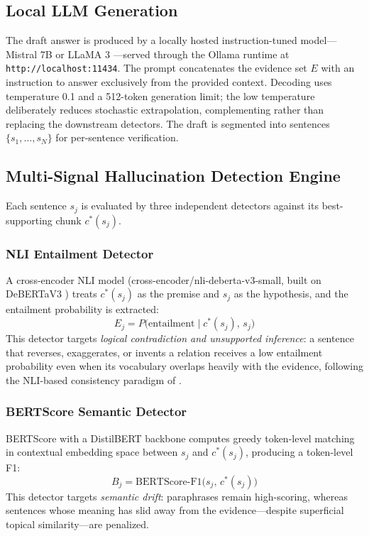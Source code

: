 \documentclass[journal]{IEEEtran}
\begin{document}
\subsection{Local LLM Generation}
The draft answer is produced by a locally hosted instruction-tuned
model---Mistral 7B \cite{jiang2023mistral} or LLaMA 3
\cite{touvron2023llama}---served through the Ollama runtime at
\texttt{http://localhost:11434}. The prompt concatenates the evidence set
$E$ with an instruction to answer exclusively from the provided context.
Decoding uses temperature 0.1 and a 512-token generation limit; the low
temperature deliberately reduces stochastic extrapolation, complementing
rather than replacing the downstream detectors. The draft is segmented into
sentences $\{s_1, \ldots, s_N\}$ for per-sentence verification.

\subsection{Multi-Signal Hallucination Detection Engine}
Each sentence $s_j$ is evaluated by three independent detectors against its
best-supporting chunk $c^{*}(s_j)$.

\subsubsection{NLI Entailment Detector}
A cross-encoder NLI model (cross-encoder/nli-deberta-v3-small, built on
DeBERTaV3 \cite{he2023debertav3}) treats $c^{*}(s_j)$ as the premise and
$s_j$ as the hypothesis, and the entailment probability is extracted:
\begin{equation}
E_j = P\big(\mathrm{entailment} \mid c^{*}(s_j),\, s_j\big)
\label{eq:nli}
\end{equation}
This detector targets \emph{logical contradiction and unsupported
inference}: a sentence that reverses, exaggerates, or invents a relation
receives a low entailment probability even when its vocabulary overlaps
heavily with the evidence, following the NLI-based consistency paradigm of
\cite{kryscinski2020factcc,laban2022summac}.

\subsubsection{BERTScore Semantic Detector}
BERTScore \cite{zhang2020bertscore} with a DistilBERT backbone
\cite{sanh2019distilbert} computes greedy token-level matching in contextual
embedding space between $s_j$ and $c^{*}(s_j)$, producing a token-level F1:
\begin{equation}
B_j = \mathrm{BERTScore\mbox{-}F1}\big(s_j,\, c^{*}(s_j)\big)
\label{eq:bertscore}
\end{equation}
This detector targets \emph{semantic drift}: paraphrases remain
high-scoring, whereas sentences whose meaning has slid away from the
evidence---despite superficial topical similarity---are penalized.
\end{document}
